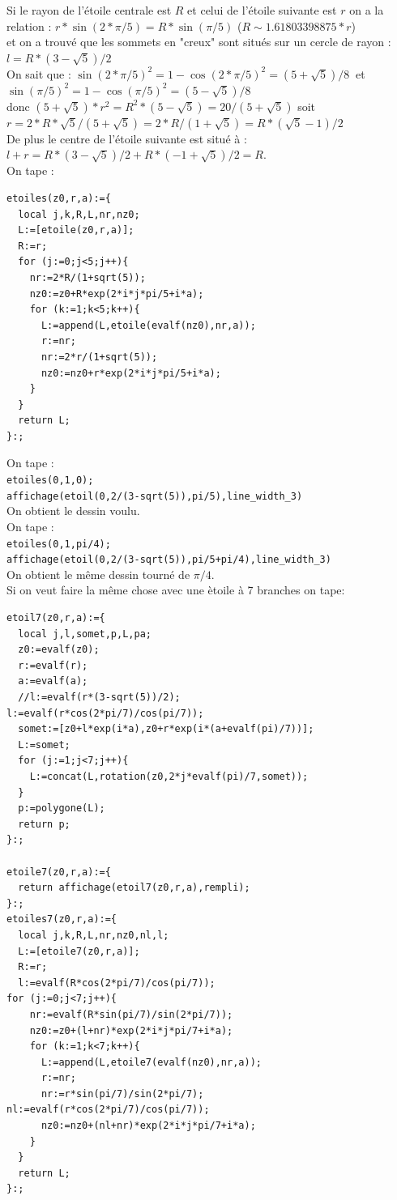 \documentclass[a4paper,11pt]{book}
\begin{document}
Si le rayon de l'\'etoile centrale est $R$ et celui de l'\'etoile suivante est 
$r$ on a la relation :
$r*\sin(2*\pi/5)=R*\sin(\pi/5)$ ($R\sim 1.61803398875*r$)\\
et on a trouv\'e que les sommets en "creux" sont situ\'es sur un cercle de 
rayon : $l=R*(3-\sqrt 5)/2$\\
On sait que :
$\sin(2*\pi/5)^2=1-\cos(2*\pi/5)^2=(5+\sqrt 5)/8\ $ et \\
$\sin(\pi/5)^2=1-\cos(\pi/5)^2=(5-\sqrt 5)/8$\\
donc $(5+\sqrt 5)*r^2=R^2*(5-\sqrt 5)=20/(5+\sqrt 5)$ soit \\
$r=2*R*\sqrt 5/(5+\sqrt 5)=2*R/(1+\sqrt 5)=R*(\sqrt 5-1)/2$\\
De plus le centre de l'\'etoile suivante est situ\'e \`a :\\
$l+r=R*(3-\sqrt 5)/2+R*(-1+\sqrt 5)/2=R$.\\
On tape : 
\begin{verbatim}
etoiles(z0,r,a):={
  local j,k,R,L,nr,nz0;
  L:=[etoile(z0,r,a)];
  R:=r;
  for (j:=0;j<5;j++){
    nr:=2*R/(1+sqrt(5));
    nz0:=z0+R*exp(2*i*j*pi/5+i*a);
    for (k:=1;k<5;k++){
      L:=append(L,etoile(evalf(nz0),nr,a));
      r:=nr;
      nr:=2*r/(1+sqrt(5));
      nz0:=nz0+r*exp(2*i*j*pi/5+i*a);
    }
  }
  return L;
}:;
\end{verbatim}
On tape :\\
{\tt etoiles(0,1,0);}\\
{\tt affichage(etoil(0,2/(3-sqrt(5)),pi/5),line\_width\_3)}\\
On obtient le dessin voulu.\\
On tape :\\
{\tt etoiles(0,1,pi/4);}\\
{\tt affichage(etoil(0,2/(3-sqrt(5)),pi/5+pi/4),line\_width\_3)}\\
On obtient le m\^eme dessin tourn\'e de $\pi/4$.\\

Si on veut faire la m\^eme chose avec une \`etoile \`a 7 branches on tape:
\begin{verbatim}
etoil7(z0,r,a):={
  local j,l,somet,p,L,pa;
  z0:=evalf(z0);
  r:=evalf(r);
  a:=evalf(a);
  //l:=evalf(r*(3-sqrt(5))/2);
l:=evalf(r*cos(2*pi/7)/cos(pi/7));
  somet:=[z0+l*exp(i*a),z0+r*exp(i*(a+evalf(pi)/7))];
  L:=somet;
  for (j:=1;j<7;j++){
    L:=concat(L,rotation(z0,2*j*evalf(pi)/7,somet));
  }
  p:=polygone(L);
  return p;
}:;

etoile7(z0,r,a):={
  return affichage(etoil7(z0,r,a),rempli);
}:;
etoiles7(z0,r,a):={
  local j,k,R,L,nr,nz0,nl,l;
  L:=[etoile7(z0,r,a)];
  R:=r;
  l:=evalf(R*cos(2*pi/7)/cos(pi/7));
for (j:=0;j<7;j++){
    nr:=evalf(R*sin(pi/7)/sin(2*pi/7));
    nz0:=z0+(l+nr)*exp(2*i*j*pi/7+i*a);
    for (k:=1;k<7;k++){
      L:=append(L,etoile7(evalf(nz0),nr,a));
      r:=nr;
      nr:=r*sin(pi/7)/sin(2*pi/7);
nl:=evalf(r*cos(2*pi/7)/cos(pi/7));
      nz0:=nz0+(nl+nr)*exp(2*i*j*pi/7+i*a);
    }
  }
  return L;
}:;
\end{verbatim}
\end{document}

